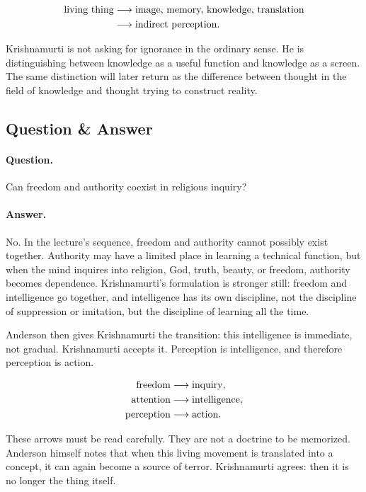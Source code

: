 \begin{align}
\hbox{living thing}
&\longrightarrow \hbox{image, memory, knowledge, translation}\\
&\longrightarrow \hbox{indirect perception}.
\end{align}

Krishnamurti is not asking for ignorance in the ordinary sense. He is distinguishing between knowledge as a useful function and knowledge as a screen. The same distinction will later return as the difference between thought in the field of knowledge and thought trying to construct reality.

\subsection{Question \& Answer}

\paragraph{Question.}
Can freedom and authority coexist in religious inquiry?

\paragraph{Answer.}
No. In the lecture's sequence, freedom and authority cannot possibly exist together. Authority may have a limited place in learning a technical function, but when the mind inquires into religion, God, truth, beauty, or freedom, authority becomes dependence. Krishnamurti's formulation is stronger still: freedom and intelligence go together, and intelligence has its own discipline, not the discipline of suppression or imitation, but the discipline of learning all the time.

Anderson then gives Krishnamurti the transition: this intelligence is immediate, not gradual. Krishnamurti accepts it. Perception is intelligence, and therefore perception is action.

\begin{align}
\hbox{freedom} &\longrightarrow \hbox{inquiry},\\
\hbox{attention} &\longrightarrow \hbox{intelligence},\\
\hbox{perception} &\longrightarrow \hbox{action}.
\end{align}

These arrows must be read carefully. They are not a doctrine to be memorized. Anderson himself notes that when this living movement is translated into a concept, it can again become a source of terror. Krishnamurti agrees: then it is no longer the thing itself.

